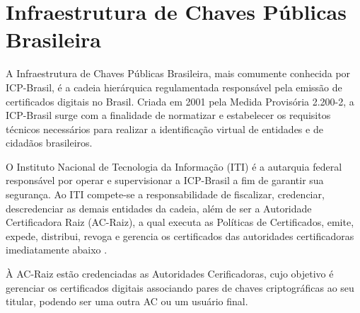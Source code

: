 \section{Infraestrutura de Chaves Públicas Brasileira}

A Infraestrutura de Chaves Públicas Brasileira, mais comumente conhecida por ICP-Brasil, é a cadeia hierárquica regulamentada  responsável pela emissão de certificados digitais no Brasil. Criada em 2001 pela Medida Provisória 2.200-2, a ICP-Brasil surge com a finalidade de normatizar e estabelecer os requisitos técnicos necessários para realizar a identificação virtual de entidades e de cidadãos brasileiros.

O Instituto Nacional de Tecnologia da Informação (ITI) é a autarquia federal responsável por operar e supervisionar a ICP-Brasil a fim de garantir sua segurança. Ao ITI compete-se a responsabilidade de fiscalizar, credenciar, descredenciar as demais entidades da cadeia, além de ser a Autoridade Certificadora Raiz (AC-Raiz), a qual executa as Políticas de Certificados, emite, expede, distribui, revoga e gerencia os certificados das autoridades certificadoras imediatamente abaixo \cite{ICPBrasi30}.

À AC-Raiz estão credenciadas as Autoridades Cerificadoras, cujo objetivo é gerenciar os certificados digitais associando pares de chaves criptográficas ao seu titular, podendo ser uma outra AC ou um usuário final.

 